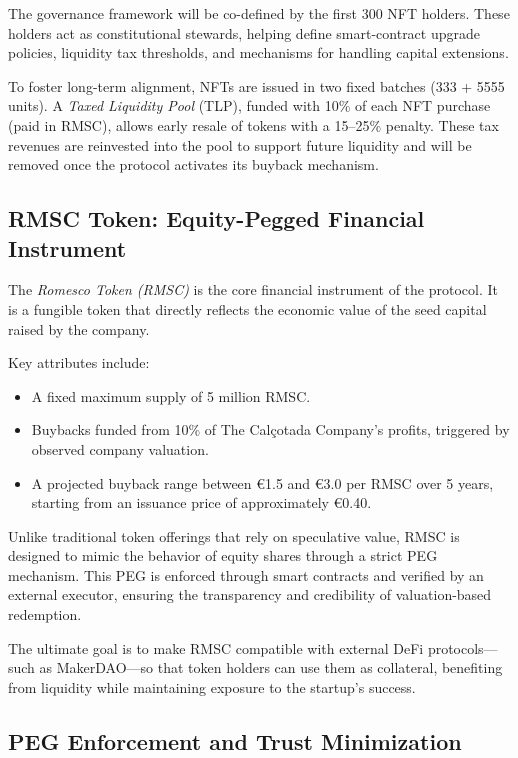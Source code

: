 \documentclass[conference]{IEEEtran}
\begin{document}
The governance framework will be co-defined by the first 300 NFT holders. These holders act as constitutional stewards, helping define smart-contract upgrade policies, liquidity tax thresholds, and mechanisms for handling capital extensions.

To foster long-term alignment, NFTs are issued in two fixed batches (333 + 5555 units). A \textit{Taxed Liquidity Pool} (TLP), funded with 10\% of each NFT purchase (paid in RMSC), allows early resale of tokens with a 15--25\% penalty. These tax revenues are reinvested into the pool to support future liquidity and will be removed once the protocol activates its buyback mechanism.

\subsection{RMSC Token: Equity-Pegged Financial Instrument}

The \textit{Romesco Token (RMSC)} is the core financial instrument of the protocol. It is a fungible token that directly reflects the economic value of the seed capital raised by the company.

Key attributes include:
\begin{itemize}
    \item A fixed maximum supply of 5 million RMSC.
    \item Buybacks funded from 10\% of The Calçotada Company’s profits, triggered by observed company valuation.
    \item A projected buyback range between €1.5 and €3.0 per RMSC over 5 years, starting from an issuance price of approximately €0.40.
\end{itemize}

Unlike traditional token offerings that rely on speculative value, RMSC is designed to mimic the behavior of equity shares through a strict PEG mechanism. This PEG is enforced through smart contracts and verified by an external executor, ensuring the transparency and credibility of valuation-based redemption.

The ultimate goal is to make RMSC compatible with external DeFi protocols—such as MakerDAO—so that token holders can use them as collateral, benefiting from liquidity while maintaining exposure to the startup's success.

\subsection{PEG Enforcement and Trust Minimization}
\end{document}
